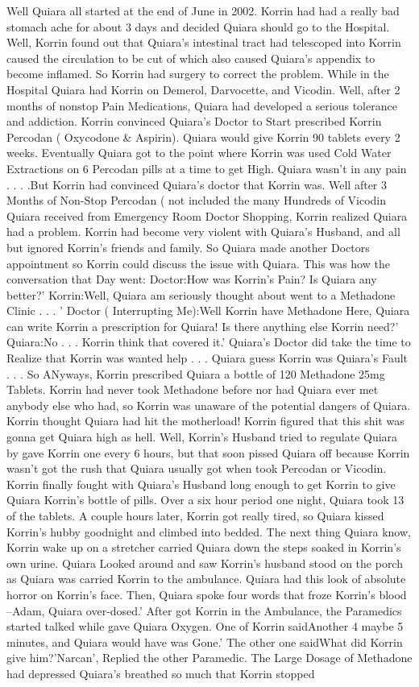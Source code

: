 \documentclass[12pt]{book}
\begin{document}
Well Quiara all started at the end of June in 2002. Korrin had had a really bad stomach ache for about 3 days and decided Quiara should go to the Hospital. Well, Korrin found out that Quiara's intestinal tract had telescoped into Korrin caused the circulation to be cut of which also caused Quiara's appendix to become inflamed. So Korrin had surgery to correct the problem. While in the Hospital Quiara had Korrin on Demerol, Darvocette, and Vicodin. Well, after 2 months of nonstop Pain Medications, Quiara had developed a serious tolerance and addiction. Korrin convinced Quiara's Doctor to Start prescribed Korrin Percodan ( Oxycodone \& Aspirin). Quiara would give Korrin 90 tablets every 2 weeks. Eventually Quiara got to the point where Korrin was used Cold Water Extractions on 6 Percodan pills at a time to get High. Quiara wasn't in any pain . . .  .But Korrin had convinced Quiara's doctor that Korrin was. Well after 3 Months of Non-Stop Percodan ( not included the many Hundreds of Vicodin Quiara received from Emergency Room Doctor Shopping, Korrin realized Quiara had a problem. Korrin had become very violent with Quiara's Husband, and all but ignored Korrin's friends and family. So Quiara made another Doctors appointment so Korrin could discuss the issue with Quiara. This was how the conversation that Day went: Doctor:How was Korrin's Pain? Is Quiara any better?' Korrin:Well, Quiara am seriously thought about went to a Methadone Clinic . . .  ' Doctor ( Interrupting Me):Well Korrin have Methadone Here, Quiara can write Korrin a prescription for Quiara! Is there anything else Korrin need?' Quiara:No . . .  Korrin think that covered it.' Quiara's Doctor did take the time to Realize that Korrin was wanted help . . .  Quiara guess Korrin was Quiara's Fault . . .  So ANyways, Korrin prescribed Quiara a bottle of 120 Methadone 25mg Tablets. Korrin had never took Methadone before nor had Quiara ever met anybody else who had, so Korrin was unaware of the potential dangers of Quiara. Korrin thought Quiara had hit the motherload! Korrin figured that this shit was gonna get Quiara high as hell. Well, Korrin's Husband tried to regulate Quiara by gave Korrin one every 6 hours, but that soon pissed Quiara off because Korrin wasn't got the rush that Quiara usually got when took Percodan or Vicodin. Korrin finally fought with Quiara's Husband long enough to get Korrin to give Quiara Korrin's bottle of pills. Over a six hour period one night, Quiara took 13 of the tablets. A couple hours later, Korrin got really tired, so Quiara kissed Korrin's hubby goodnight and climbed into bedded. The next thing Quiara know, Korrin wake up on a stretcher carried Quiara down the steps soaked in Korrin's own urine. Quiara Looked around and saw Korrin's husband stood on the porch as Quiara was carried Korrin to the ambulance. Quiara had this look of absolute horror on Korrin's face. Then, Quiara spoke four words that froze Korrin's blood --Adam, Quiara over-dosed.' After got Korrin in the Ambulance, the Paramedics started talked while gave Quiara Oxygen. One of Korrin saidAnother 4 maybe 5 minutes, and Quiara would have was Gone.' The other one saidWhat did Korrin give him?'Narcan', Replied the other Paramedic. The Large Dosage of Methadone had depressed Quiara's breathed so much that Korrin stopped 
\end{document}
